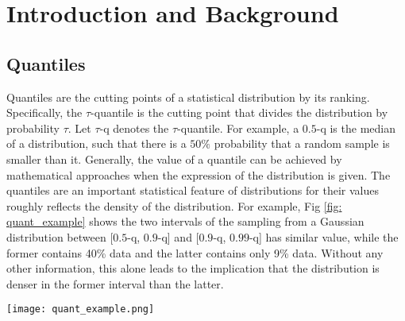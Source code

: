 \chapter{Introduction and Background}
\label{ch: intro}

\graphicspath{{Figures/Intro/}{./}} 

\section{Quantiles}
\label{sec: intro_quant}
Quantiles are the cutting points of a statistical distribution by its ranking. Specifically, the $\tau$-quantile is the cutting point that divides the distribution by probability $\tau$. Let $\tau$-q denotes the $\tau$-quantile. For example, a $0.5$-q is the median of a distribution, such that there is a $50\%$ probability that a random sample is smaller than it. Generally, the value of a quantile can be achieved by mathematical approaches when the expression of the distribution is given. 
The quantiles are an important statistical feature of distributions for their values roughly reflects the density of the distribution.
For example, Fig \ref{fig: quant_example} shows the two intervals of the sampling from a Gaussian distribution between [$0.5$-q, $0.9$-q] and [$0.9$-q, $0.99$-q] has similar value, while the former contains 40\% data and the latter contains only 9\% data. Without any other information, this alone leads to the implication that the distribution is denser in the former interval than the latter.

\begin{figure*}[h!]
    \centering
	\texttt{[image: quant\_example.png]}
    \caption{Quantiles (0.5-q, 0.9-q and 0.99-q) of a dataset containing 2000 random samples from a Gaussian distribution (mean = 2, standard deviation = 18)}
    \label{fig: quant_example}
\end{figure*}

